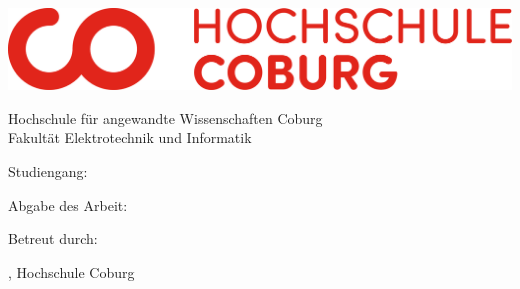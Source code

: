 
\begin{titlepage}

  \centering
  \includegraphics[width=\textwidth]{framework/Logo_HS_Coburg}

  \begin{Large}
    Hochschule für angewandte Wissenschaften Coburg\\
    Fakultät Elektrotechnik und Informatik\par
  \end{Large}
  \vspace{1.5cm}

  \Large{Studiengang: \Studiengang}
  \vspace{1.5cm}

  \Large{\DocumentType}
  \vspace{1cm}

  \Huge{\Titel}
  \vspace{2cm}

  \huge{\Autorenname}
  \vspace{2cm}

  \Large{Abgabe des Arbeit: \Abgabe}

  \Large{Betreut durch:}

  \Large{\Betreuer, Hochschule Coburg}

\end{titlepage}

\restoregeometry